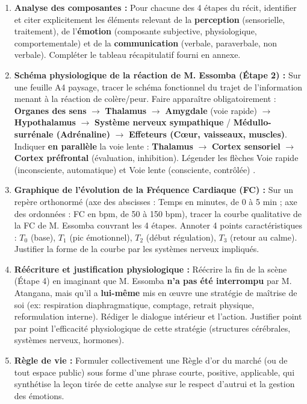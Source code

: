 \documentclass[11pt]{article}
\begin{document}
\begin{enumerate}
    \item \textbf{Analyse des composantes :} Pour chacune des 4 étapes du récit, identifier et citer explicitement les éléments relevant de la \textbf{perception} (sensorielle, traitement), de l'\textbf{émotion} (composante subjective, physiologique, comportementale) et de la \textbf{communication} (verbale, paraverbale, non verbale). Compléter le tableau récapitulatif fourni en annexe.
    \item \textbf{Schéma physiologique de la réaction de M. Essomba (Étape 2) :} Sur une feuille A4 paysage, tracer le schéma fonctionnel du trajet de l'information menant à la réaction de colère/peur. Faire apparaître obligatoirement : \textbf{Organes des sens} $\rightarrow$ \textbf{Thalamus} $\rightarrow$ \textbf{Amygdale} (voie rapide) $\rightarrow$ \textbf{Hypothalamus} $\rightarrow$ \textbf{Système nerveux sympathique} / \textbf{Médullo-surrénale (Adrénaline)} $\rightarrow$ \textbf{Effeteurs (Cœur, vaisseaux, muscles)}. Indiquer \textbf{en parallèle} la voie lente : \textbf{Thalamus} $\rightarrow$ \textbf{Cortex sensoriel} $\rightarrow$ \textbf{Cortex préfrontal} (évaluation, inhibition). Légender les flèches \og Voie rapide (inconsciente, automatique) \fg et \og Voie lente (consciente, contrôlée) \fg.
    \item \textbf{Graphique de l'évolution de la Fréquence Cardiaque (FC) :} Sur un repère orthonormé (axe des abscisses : Temps en minutes, de 0 à 5 min ; axe des ordonnées : FC en bpm, de 50 à 150 bpm), tracer la courbe qualitative de la FC de M. Essomba couvrant les 4 étapes. Annoter 4 points caractéristiques : $T_0$ (base), $T_1$ (pic émotionnel), $T_2$ (début régulation), $T_3$ (retour au calme). Justifier la forme de la courbe par les systèmes nerveux impliqués.
    \item \textbf{Réécriture et justification physiologique :} Réécrire la fin de la scène (Étape 4) en imaginant que M. Essomba \textbf{n'a pas été interrompu} par M. Atangana, mais qu'il a \textbf{lui-même} mis en œuvre une stratégie de maîtrise de soi (ex: respiration diaphragmatique, comptage, retrait physique, reformulation interne). Rédiger le dialogue intérieur et l'action. Justifier point par point l'efficacité physiologique de cette stratégie (structures cérébrales, systèmes nerveux, hormones).
    \item \textbf{Règle de vie :} Formuler collectivement une \og Règle d'or du marché \fg (ou de tout espace public) sous forme d'une phrase courte, positive, applicable, qui synthétise la leçon tirée de cette analyse sur le respect d'autrui et la gestion des émotions.
\end{enumerate}
\end{document}
